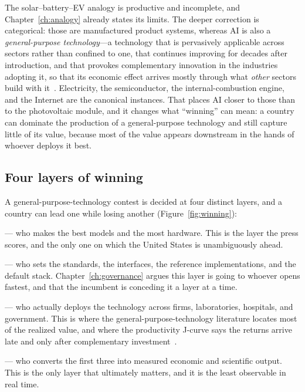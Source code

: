The solar--battery--EV analogy is productive and incomplete, and Chapter~\ref{ch:analogy} already states its limits. The deeper correction is categorical: those are manufactured product systems, whereas AI is also a \emph{general-purpose technology}---a technology that is pervasively applicable across sectors rather than confined to one, that continues improving for decades after introduction, and that provokes complementary innovation in the industries adopting it, so that its economic effect arrives mostly through what \emph{other} sectors build with it~\cite{bresnahan1995,helpman1998}. Electricity, the semiconductor, the internal-combustion engine, and the Internet are the canonical instances. That places AI closer to those than to the photovoltaic module, and it changes what ``winning'' can mean: a country can dominate the production of a general-purpose technology and still capture little of its value, because most of the value appears downstream in the hands of whoever deploys it best.

\subsection{Four layers of winning}



A general-purpose-technology contest is decided at four distinct layers, and a country can lead one while losing another (Figure~\ref{fig:winning}):

\begin{description}\itemsep2pt
  \item[Production leadership] --- who makes the best models and the most hardware. This is the layer the press scores, and the only one on which the United States is unambiguously ahead.
  \item[Platform leadership] --- who sets the standards, the interfaces, the reference implementations, and the default stack. Chapter~\ref{ch:governance} argues this layer is going to whoever opens fastest, and that the incumbent is conceding it a layer at a time.
  \item[Diffusion leadership] --- who actually deploys the technology across firms, laboratories, hospitals, and government. This is where the general-purpose-technology literature locates most of the realized value, and where the productivity J-curve says the returns arrive late and only after complementary investment~\cite{brynjolfsson2021}.
  \item[Productivity leadership] --- who converts the first three into measured economic and scientific output. This is the only layer that ultimately matters, and it is the least observable in real time.
\end{description}

